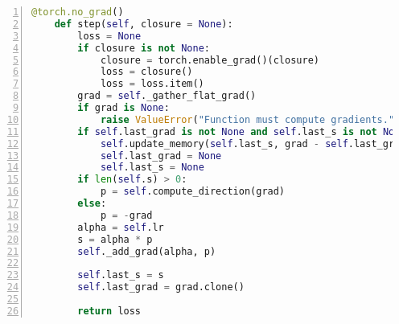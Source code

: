 \begin{lstlisting}[language=python,numbers=left]
    @torch.no_grad()
    def step(self, closure = None):
        loss = None
        if closure is not None:
            closure = torch.enable_grad()(closure)
            loss = closure()
            loss = loss.item()
        grad = self._gather_flat_grad()
        if grad is None:
            raise ValueError("Function must compute gradients.")
        if self.last_grad is not None and self.last_s is not None:
            self.update_memory(self.last_s, grad - self.last_grad)
            self.last_grad = None
            self.last_s = None
        if len(self.s) > 0:
            p = self.compute_direction(grad)
        else:
            p = -grad
        alpha = self.lr
        s = alpha * p
        self._add_grad(alpha, p)
        
        self.last_s = s
        self.last_grad = grad.clone()

        return loss
\end{lstlisting}


